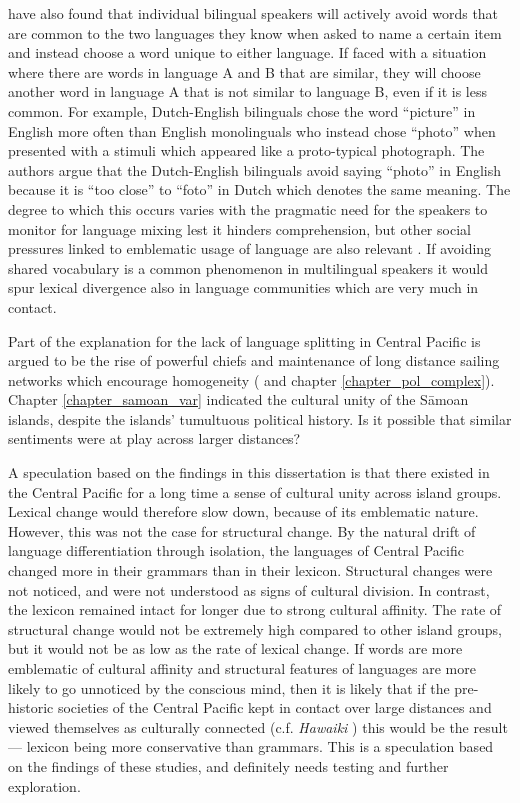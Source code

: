 \documentclass[draft,10pt]{article} %
\begin{document}
\cite{ellison2017language} have also found that individual bilingual speakers will actively avoid words that are common to the two languages they know when asked to name a certain item and instead choose a word unique to either language. If faced with a situation where there are words in language A and B that are similar, they will choose another word in language A that is not similar to language B, even if it is less common. For example, Dutch-English bilinguals chose the word ``picture'' in English more often than English monolinguals who instead chose ``photo'' when presented with a stimuli which appeared like a proto-typical photograph. The authors argue that the Dutch-English bilinguals avoid saying ``photo'' in English because it is ``too close'' to ``foto'' in Dutch which denotes the same meaning. The degree to which this occurs varies with the pragmatic need for the speakers to monitor for language mixing lest it hinders comprehension, but other social pressures linked to emblematic usage of language are also relevant  \cite[277]{ellison2017language}. If avoiding shared vocabulary is a common phenomenon in multilingual speakers it would spur lexical divergence also in language communities which are very much in contact.

Part of the explanation for the lack of language splitting in Central Pacific is argued to be the rise of powerful chiefs and maintenance of long distance sailing networks which encourage homogeneity (\citet{pawley2007} and chapter \ref{chapter_pol_complex}). Chapter \ref{chapter_samoan_var} indicated the cultural unity of the S\={a}moan islands, despite the islands' tumultuous political history. Is it possible that similar sentiments were at play across larger distances? 

A speculation based on the findings in this dissertation is that there existed in the Central Pacific for a long time a sense of cultural unity across island groups. Lexical change would therefore slow down, because of its emblematic nature. However, this was not the case for structural change. By the natural drift of language differentiation through isolation, the languages of Central Pacific changed more in their grammars than in their lexicon. Structural changes were not noticed, and were not understood as signs of cultural division. In contrast, the lexicon remained intact for longer due to strong cultural affinity. The rate of structural change would not be extremely high compared to other island groups, but it would not be as low as the rate of lexical change. If words are more emblematic of cultural affinity and structural features of languages are more likely to go unnoticed by the conscious mind, then it is likely that if the pre-historic societies of the Central Pacific kept in contact over large distances and viewed themselves as culturally connected (c.f. \emph{Hawaiki} \citep{kirchgreen2001}) this would be the result --- lexicon being more conservative than grammars. This is a speculation based on the findings of these studies, and definitely needs testing and further exploration. 
\end{document}
